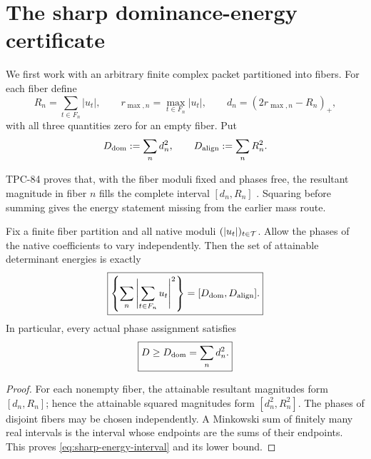 \section{The sharp dominance-energy certificate}
\label{sec:dominance-energy}

We first work with an arbitrary finite complex packet partitioned into
fibers.  For each fiber define
\begin{equation}
 R_n=\sum_{t\in F_n}|u_t|,\qquad
 r_{\max,n}=\max_{t\in F_n}|u_t|,\qquad
 d_n=(2r_{\max,n}-R_n)_+,
\label{eq:fiber-defect}
\end{equation}
with all three quantities zero for an empty fiber.  Put
\begin{equation}
 D_{\mathrm{dom}}:=\sum_nd_n^2,\qquad
 D_{\rm align}:=\sum_nR_n^2.
\label{eq:dominance-alignment-energies}
\end{equation}

TPC-84 proves that, with the fiber moduli fixed and phases free, the
resultant magnitude in fiber \(n\) fills the complete interval
\([d_n,R_n]\) \citep{WangTPC84}.  Squaring before summing gives the
energy statement missing from the earlier mass route.

\begin{theorem}
\label{thm:sharp-energy-interval}
Fix a finite fiber partition and all native moduli
\((|u_t|)_{t\in\mathcal T}\).  Allow the phases of the native coefficients to
vary independently.  Then the set of attainable determinant energies
is exactly
\begin{equation}
 \boxed{
 \left\{
 \sum_n\left|\sum_{t\in F_n}u_t\right|^2
 \right\}
 =
 [D_{\mathrm{dom}},D_{\rm align}].}
\label{eq:sharp-energy-interval}
\end{equation}
In particular, every actual phase assignment satisfies
\begin{equation}
 \boxed{D\ge D_{\mathrm{dom}}=\sum_nd_n^2.}
\label{eq:dominance-energy-lower}
\end{equation}
\end{theorem}

\begin{proof}
For each nonempty fiber, the attainable resultant magnitudes form
\([d_n,R_n]\); hence the attainable squared magnitudes form
\([d_n^2,R_n^2]\).  The phases of disjoint fibers may be chosen
independently.  A Minkowski sum of finitely many real intervals is the
interval whose endpoints are the sums of their endpoints.  This proves
\eqref{eq:sharp-energy-interval} and its lower bound.
\end{proof}

